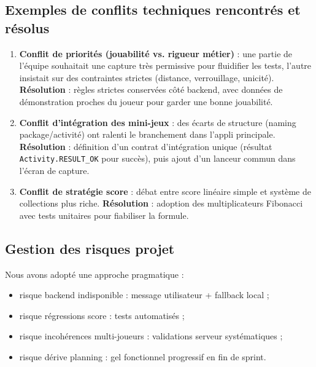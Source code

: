 \documentclass[11pt,a4paper]{article}
\begin{document}
\subsection{Exemples de conflits techniques rencontrés et résolus}
\begin{enumerate}[leftmargin=1.2cm]
  \item \textbf{Conflit de priorités (jouabilité vs. rigueur métier)} :
  une partie de l'équipe souhaitait une capture très permissive pour fluidifier les tests, l'autre insistait sur des contraintes strictes (distance, verrouillage, unicité).\newline
  \textbf{Résolution} : règles strictes conservées côté backend, avec données de démonstration proches du joueur pour garder une bonne jouabilité.

  \item \textbf{Conflit d'intégration des mini-jeux} :
  des écarts de structure (naming package/activité) ont ralenti le branchement dans l'appli principale.\newline
  \textbf{Résolution} : définition d'un contrat d'intégration unique (résultat \texttt{Activity.RESULT\_OK} pour succès), puis ajout d'un lanceur commun dans l'écran de capture.

  \item \textbf{Conflit de stratégie score} :
  débat entre score linéaire simple et système de collections plus riche.\newline
  \textbf{Résolution} : adoption des multiplicateurs Fibonacci avec tests unitaires pour fiabiliser la formule.
\end{enumerate}

\subsection{Gestion des risques projet}
Nous avons adopté une approche pragmatique :
\begin{itemize}[leftmargin=1.2cm]
  \item risque backend indisponible : message utilisateur + fallback local ;
  \item risque régressions score : tests automatisés ;
  \item risque incohérences multi-joueurs : validations serveur systématiques ;
  \item risque dérive planning : gel fonctionnel progressif en fin de sprint.
\end{itemize}
\end{document}
